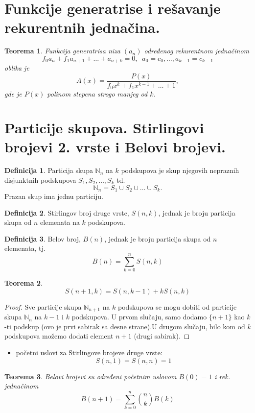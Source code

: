 \documentclass[a4paper,12pt]{article}
\numberwithin{algorithm}{section}
\theoremstyle{plain}
\newtheorem{theorem}{Teorema}[section]
\theoremstyle{definition}
\newtheorem{definition}{Definicija}[section]
\theoremstyle{remark}
\begin{document}
\section{Funkcije generatrise i rešavanje rekurentnih jednačina.}
\begin{theorem}
    Funkcija generatrisa niza $(a_n)$ određenog rekurentnom jednačinom 
    \[ f_0a_n + f_1a_{n+1}+ \ldots + a_{n+k} = 0, \;\; a_0 = c_0, \ldots, a_{k-1}= c_{k-1} \]
    oblika je
    \[ A(x) = \frac{P(x)}{f_0x^k + f_1x^{k-1} + \ldots + 1}, \]
    gde je $P(x)$ polinom stepena strogo manjeg od $k$.
\end{theorem}
\newpage
\section{Particije skupova. Stirlingovi brojevi 2. vrste i Belovi brojevi. }
\begin{definition}
    Particija skupa $\mathbb{N}_n$ na $k$ podskupova je skup njegovih nepraznih disjunktnih podskupova $S_1, S_2, \ldots, S_k$ td.
    \[ \mathbb{N}_n = S_1 \cup S_2 \cup \dots \cup S_k. \]
    Prazan skup ima jednu particiju.
\end{definition}

\begin{definition}
    Stirlingov broj druge vrste, $S(n, k)$, jednak je broju particija skupa od $n$ elemenata na $k$ podskupova.
\end{definition}

\begin{definition}
    Belov broj, $B(n)$, jednak je broju particija skupa od $n$ elemenata, tj.
    \[ B(n) = \sum_{k=0}^{n} S(n, k) \]
\end{definition}

\begin{theorem}
    \[ S(n + 1, k) = S(n, k - 1) + kS(n, k) \]
\end{theorem}
\begin{proof}
    Sve particije skupa $\mathbb{N}_{n+1}$ na $k$ podskupova se mogu dobiti od particije skupa $\mathbb{N}_n$ na $k-1$ i $k$ podskupova. U prvom slučaju, samo dodamo $\{n + 1\}$ kao $k$-ti podskup (ovo je prvi sabirak sa desne strane).U drugom slučaju, bilo kom od $k$ podskupova možemo dodati element $n+1$ (drugi sabirak).
\end{proof}
\begin{itemize}
    \item početni uslovi za Stirlingove brojeve druge vrste: 
    \[ S(n, 1) = S(n, n) = 1 \]
\end{itemize}
\begin{theorem}
    Belovi brojevi su određeni početnim uslovom $B(0) = 1$ i rek. jednačinom
    \[ B(n+1) = \sum_{k= 0}^{n}{{n} \choose k}B(k) \]
\end{theorem}
\end{document}
